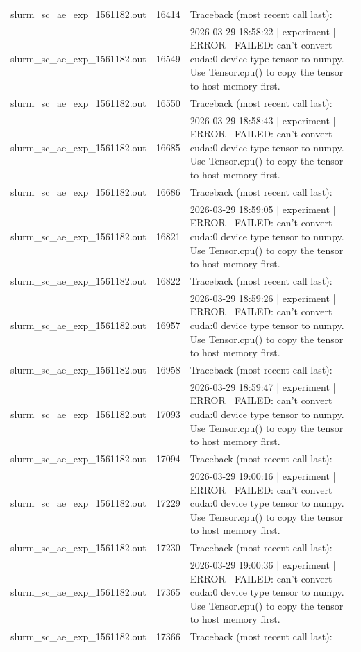 \begin{tabular}{lrl}
slurm\_sc\_ae\_exp\_1561182.out & 16414 & Traceback (most recent call last): \\
slurm\_sc\_ae\_exp\_1561182.out & 16549 & 2026-03-29 18:58:22 | experiment | ERROR |   FAILED: can't convert cuda:0 device type tensor to numpy. Use Tensor.cpu() to copy the tensor to host memory first. \\
slurm\_sc\_ae\_exp\_1561182.out & 16550 & Traceback (most recent call last): \\
slurm\_sc\_ae\_exp\_1561182.out & 16685 & 2026-03-29 18:58:43 | experiment | ERROR |   FAILED: can't convert cuda:0 device type tensor to numpy. Use Tensor.cpu() to copy the tensor to host memory first. \\
slurm\_sc\_ae\_exp\_1561182.out & 16686 & Traceback (most recent call last): \\
slurm\_sc\_ae\_exp\_1561182.out & 16821 & 2026-03-29 18:59:05 | experiment | ERROR |   FAILED: can't convert cuda:0 device type tensor to numpy. Use Tensor.cpu() to copy the tensor to host memory first. \\
slurm\_sc\_ae\_exp\_1561182.out & 16822 & Traceback (most recent call last): \\
slurm\_sc\_ae\_exp\_1561182.out & 16957 & 2026-03-29 18:59:26 | experiment | ERROR |   FAILED: can't convert cuda:0 device type tensor to numpy. Use Tensor.cpu() to copy the tensor to host memory first. \\
slurm\_sc\_ae\_exp\_1561182.out & 16958 & Traceback (most recent call last): \\
slurm\_sc\_ae\_exp\_1561182.out & 17093 & 2026-03-29 18:59:47 | experiment | ERROR |   FAILED: can't convert cuda:0 device type tensor to numpy. Use Tensor.cpu() to copy the tensor to host memory first. \\
slurm\_sc\_ae\_exp\_1561182.out & 17094 & Traceback (most recent call last): \\
slurm\_sc\_ae\_exp\_1561182.out & 17229 & 2026-03-29 19:00:16 | experiment | ERROR |   FAILED: can't convert cuda:0 device type tensor to numpy. Use Tensor.cpu() to copy the tensor to host memory first. \\
slurm\_sc\_ae\_exp\_1561182.out & 17230 & Traceback (most recent call last): \\
slurm\_sc\_ae\_exp\_1561182.out & 17365 & 2026-03-29 19:00:36 | experiment | ERROR |   FAILED: can't convert cuda:0 device type tensor to numpy. Use Tensor.cpu() to copy the tensor to host memory first. \\
slurm\_sc\_ae\_exp\_1561182.out & 17366 & Traceback (most recent call last): \\

\end{tabular}
